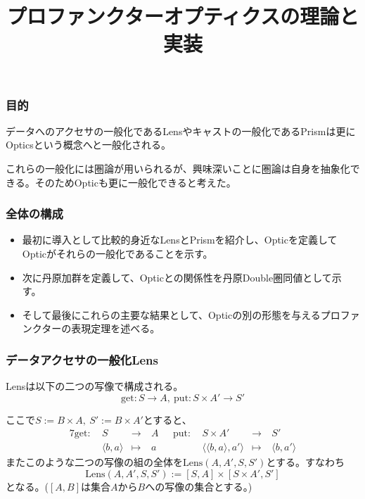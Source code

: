 \documentclass[uplatex,dvipdfmx]{beamer}
\title{プロファンクターオプティクスの理論と実装}
\newcommand{\arrow}{\rightarrow}
\newcommand{\tuple}[1]{\langle #1\rangle}
\newcommand{\mor}[3]{#1:#2\arrow #3}
\newcommand{\inset}[2]{[#1,#2]}
\begin{document}
  \begin{frame}
    \titlepage
  \end{frame}
  \begin{frame}\frametitle{目的}

    データへのアクセサの一般化であるLensやキャストの一般化であるPrismは更にOpticsという概念へと一般化される。\\
    \vspace{\baselineskip}

    これらの一般化には圏論が用いられるが、興味深いことに圏論は自身を抽象化できる。そのためOpticも更に一般化できると考えた。    
  \end{frame}
  \begin{frame}\frametitle{全体の構成}
    \begin{itemize}
      \item 最初に導入として比較的身近なLensとPrismを紹介し、Opticを定義してOpticがそれらの一般化であることを示す。\\
      \vspace{\baselineskip}
      \item 次に丹原加群を定義して、Opticとの関係性を丹原Double圏同値として示す。\\
      \vspace{\baselineskip}
      \item そして最後にこれらの主要な結果として、Opticの別の形態を与えるプロファンクターの表現定理を述べる。
    \end{itemize}
  \end{frame}
  \begin{frame}\frametitle{データアクセサの一般化Lens}
    \begin{definition}
      Lensは以下の二つの写像で構成される。
      \[\mor{\mathrm{get}}{S}{A},\ \mor{\mathrm{put}}{S\times A'}{S'}\]
    \end{definition}
    ここで$S:=B\times A,\ S':=B\times A'$とすると、
    \begin{alignat*}{7}
      \mathrm{get}:\ &S\ &\longrightarrow \ &A \ \ \ &\mathrm{put}:\ &S\times A'\ &\longrightarrow \ &S'\\
      &\tuple{b,a}&\longmapsto\ &a      &&\tuple{\tuple{b,a},a'}&\longmapsto\ &\tuple{b, a'}
    \end{alignat*}
    またこのような二つの写像の組の全体を$\mathrm{Lens}(A,A',S,S')$とする。すなわち\[\mathrm{Lens}(A,A',S,S') := \inset{S}{A}\times \inset{S\times A'}{S'}\]となる。($\inset{A}{B}$は集合$A$から$B$への写像の集合とする。)
  \end{frame}
\end{document}
